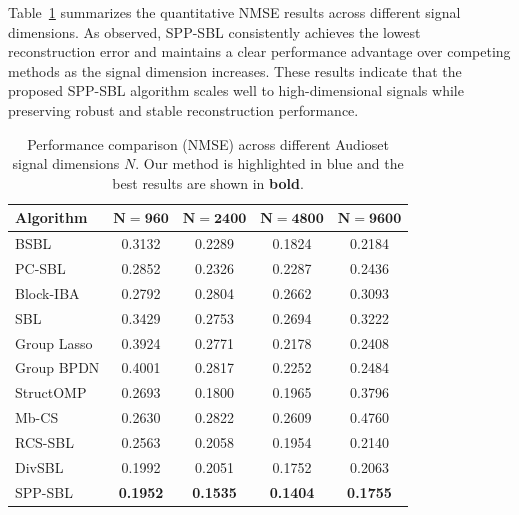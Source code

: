 \documentclass[lettersize,journal]{IEEEtran}
\theoremstyle{remark}
\begin{document}
Table~\ref{tab:dimension} summarizes the quantitative NMSE results across different signal dimensions. As observed, SPP-SBL consistently achieves the lowest reconstruction error and maintains a clear performance advantage over competing methods as the signal dimension increases. These results indicate that the proposed SPP-SBL algorithm scales well to high-dimensional signals while preserving robust and stable reconstruction performance. 
\begin{table}[t]
	\centering
	\caption{Performance comparison (NMSE) across different Audioset signal dimensions $N$. 
		Our method is highlighted in \colorbox{customblue}{blue} and the best results are shown in \textbf{bold}.}
	\label{tab:dimension}
	\small
	\renewcommand{\arraystretch}{1.0}
	\setlength{\tabcolsep}{3pt}
	\begin{tabular}{lcccc}
		\toprule
		\textbf{Algorithm} 
		& $\mathbf{N=960}$ 
		& $\mathbf{N=2400}$ 
		& $\mathbf{N=4800}$ 
		& $\mathbf{N=9600}$ \\
		\midrule
		BSBL         & 0.3132 & 0.2289& 0.1824 & 0.2184 \\
		PC-SBL       & 0.2852 &0.2326 & 0.2287 & 0.2436 \\
		Block-IBA    & 0.2792 & 0.2804& 0.2662& 0.3093\\
		SBL          & 0.3429 & 0.2753& 0.2694 & 0.3222 \\
		Group Lasso  & 0.3924 & 0.2771 & 0.2178& 0.2408 \\
		Group BPDN   & 0.4001 & 0.2817 & 0.2252 & 0.2484 \\
		StructOMP    & 0.2693 & 0.1800 & 0.1965& 0.3796 \\
		Mb-CS       & 0.2630 & 0.2822 & 0.2609 & 0.4760 \\
		RCS-SBL     & 0.2563 & 0.2058 & 0.1954 & 0.2140 \\
		DivSBL      & 0.1992 & 0.2051 & 0.1752 &0.2063 \\
		\rowcolor{customblue}
		SPP-SBL     & \textbf{0.1952} & \textbf{0.1535} & \textbf{0.1404}& \textbf{0.1755} \\
		\bottomrule
	\end{tabular}
\end{table}
\end{document}
